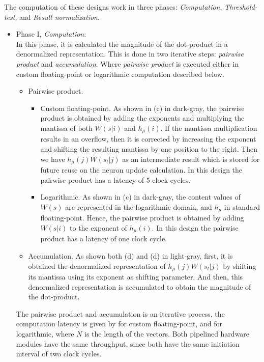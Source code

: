  The computation of these designs work in three phases: \emph{Computation}, \emph{Threshold-test}, and \emph{Result normalization}.
 
 \begin{itemize}
 	\item{Phase I, \emph{Computation}}: 
 	\\In this phase, it is calculated the magnitude of the dot-product in a denormalized representation. This is done in two iterative steps: \emph{pairwise product} and \emph{accumulation}. Where \emph{pairwise product} is executed either in custom floating-point or logarithmic computation described below.
 	 \begin{itemize}[label={--}]
 	 	\item{Pairwise product}.
 	 	\begin{itemize} [label={--}]
	 		\item{Custom floating-point}.
	 	 	As shown in (c) in dark-gray, the pairwise product is obtained by adding the exponents and multiplying the mantissa of both $W(s|i)$ and $h_\mu(i)$. If the mantissa multiplication results in an overflow, then it is corrected by increasing the  exponent and shifting the resulting mantissa by one position to the right. Then we have $h_\mu(j) W(s_t|j)$ as an intermediate result which is stored for future reuse on the neuron update calculation. In this design the pairwise product has a latency of 5 clock cycles.
	 	 	\item{Logarithmic}.
	 	 	As shown in (c) in dark-gray, the content values of $W(s)$ are represented in the logarithmic domain, and $h_\mu$ in standard floating-point. Hence, the pairwise product is obtained by adding $W(s|i)$ to the exponent of $h_\mu(i)$. In this design the pairwise product has a latency of one clock cycle.
 	 	\end{itemize}
 		\item{Accumulation}. As shown both (d) and (d) in light-gray, first, it is obtained the denormalized representation of $h_\mu(j) W(s_t|j)$ by shifting its mantissa using its exponent as shifting parameter. And then, this denormalized representation is accumulated to obtain the magnitude of the dot-product.
 	 \end{itemize}
 	The pairwise product and accumulation is an iterative process, the computation latency is given by  for custom floating-point, and  for logarithmic, where $N$ is the length of the vectors. Both pipelined hardware modules have the same throughput, since both have the same initiation interval of two clock cycles.
 	

\end{itemize}
